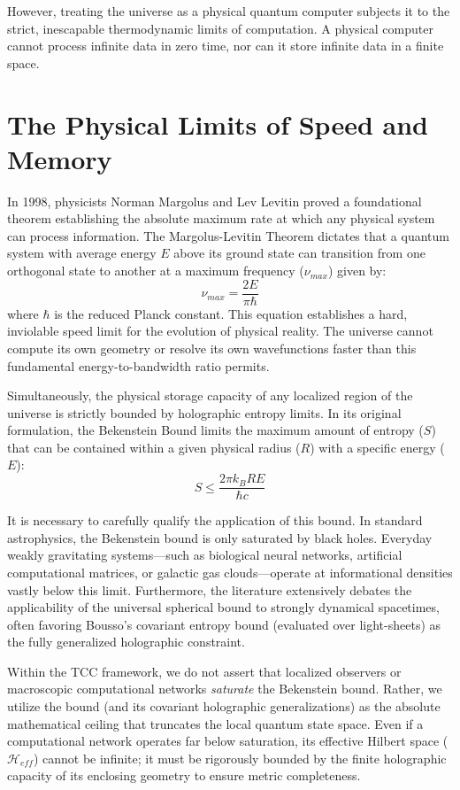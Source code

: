 \documentclass[12pt,openany]{book}
\theoremstyle{plain}
\theoremstyle{definition}
\theoremstyle{remark}
\begin{document}
However, treating the universe as a physical quantum computer subjects it to the strict, inescapable thermodynamic limits of computation. A physical computer cannot process infinite data in zero time, nor can it store infinite data in a finite space.

\section{The Physical Limits of Speed and Memory}

In 1998, physicists Norman Margolus and Lev Levitin proved a foundational theorem establishing the absolute maximum rate at which any physical system can process information. The Margolus-Levitin Theorem dictates that a quantum system with average energy $E$ above its ground state can transition from one orthogonal state to another at a maximum frequency ($\nu_{max}$) given by:
\begin{equation}
\nu_{max} = \frac{2E}{\pi\hbar}
\end{equation}
where $\hbar$ is the reduced Planck constant. This equation establishes a hard, inviolable speed limit for the evolution of physical reality. The universe cannot compute its own geometry or resolve its own wavefunctions faster than this fundamental energy-to-bandwidth ratio permits.

Simultaneously, the physical storage capacity of any localized region of the universe is strictly bounded by holographic entropy limits. In its original formulation, the Bekenstein Bound limits the maximum amount of entropy ($S$) that can be contained within a given physical radius ($R$) with a specific energy ($E$):
\begin{equation}
S \le \frac{2\pi k_B R E}{\hbar c}
\end{equation}

It is necessary to carefully qualify the application of this bound. In standard astrophysics, the Bekenstein bound is only saturated by black holes. Everyday weakly gravitating systems---such as biological neural networks, artificial computational matrices, or galactic gas clouds---operate at informational densities vastly below this limit. Furthermore, the literature extensively debates the applicability of the universal spherical bound to strongly dynamical spacetimes, often favoring Bousso's covariant entropy bound (evaluated over light-sheets) as the fully generalized holographic constraint.

Within the TCC framework, we do not assert that localized observers or macroscopic computational networks \textit{saturate} the Bekenstein bound. Rather, we utilize the bound (and its covariant holographic generalizations) as the absolute mathematical ceiling that truncates the local quantum state space. Even if a computational network operates far below saturation, its effective Hilbert space ($\mathcal{H}_{eff}$) cannot be infinite; it must be rigorously bounded by the finite holographic capacity of its enclosing geometry to ensure metric completeness. 
\end{document}
